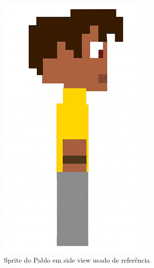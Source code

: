 \begin{figure}[htbp]
    \centering
    \caption{\small Comparação do sprite de referência com os sprites em side view das animações geradas no Gemini Pro}
    \label{fig:GeminiProAndarComparaSpriteSide2}
    \begin{subfigure}{0.32\linewidth}
        \centering
        \includegraphics[width=0.7\linewidth]{figs/geminiPro/chat6/tela3_res1.png}
        \caption{\small Sprite do Pablo em side view usado de referência}
        \label{fig:GeminiProAndarSide2}
    \end{subfigure}
    \begin{subfigure}{0.32\linewidth}
        \centering

\end{subfigure}
\end{figure}
